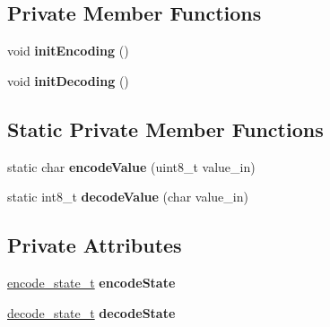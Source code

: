\subsection*{Private Member Functions}
\begin{DoxyCompactItemize}
\item 
\hypertarget{classBASE64_af9fa7d4281edab1805eb7f2971fbd5fc}{}void {\bfseries init\+Encoding} ()\label{classBASE64_af9fa7d4281edab1805eb7f2971fbd5fc}

\item 
\hypertarget{classBASE64_a1e10e9cbe0ee6142687b64a4be5137ce}{}void {\bfseries init\+Decoding} ()\label{classBASE64_a1e10e9cbe0ee6142687b64a4be5137ce}

\end{DoxyCompactItemize}
\subsection*{Static Private Member Functions}
\begin{DoxyCompactItemize}
\item 
\hypertarget{classBASE64_afd080eb9486df87e89bf0f2e0e2a139c}{}static char {\bfseries encode\+Value} (uint8\+\_\+t value\+\_\+in)\label{classBASE64_afd080eb9486df87e89bf0f2e0e2a139c}

\item 
\hypertarget{classBASE64_a767032fc1907ee6d155696769ae354d3}{}static int8\+\_\+t {\bfseries decode\+Value} (char value\+\_\+in)\label{classBASE64_a767032fc1907ee6d155696769ae354d3}

\end{DoxyCompactItemize}
\subsection*{Private Attributes}
\begin{DoxyCompactItemize}
\item 
\hypertarget{classBASE64_ac083a0eed0bf1d6912e0fbc33de91c43}{}\hyperlink{structencode__state__t}{encode\+\_\+state\+\_\+t} {\bfseries encode\+State}\label{classBASE64_ac083a0eed0bf1d6912e0fbc33de91c43}

\item 
\hypertarget{classBASE64_a6dde03f16d11187ac6cc91f325d99b3d}{}\hyperlink{structdecode__state__t}{decode\+\_\+state\+\_\+t} {\bfseries decode\+State}\label{classBASE64_a6dde03f16d11187ac6cc91f325d99b3d}

\end{DoxyCompactItemize}


